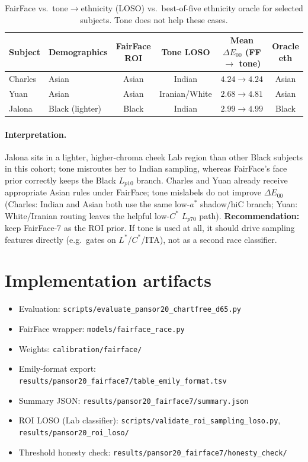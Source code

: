 \documentclass[11pt]{article}
\newcommand{\deee}{\ensuremath{\Delta E_{00}}}
\begin{document}
\begin{table}[h]
\centering
\caption{FairFace vs.\ tone$\to$ethnicity (LOSO) vs.\ best-of-five ethnicity oracle for selected subjects.
Tone does not help these cases.}
\label{tab:tone-cases}
\begin{tabular}{llcccc}
\toprule
Subject & Demographics & FairFace ROI & Tone LOSO & Mean $\deee$ (FF $\to$ tone) & Oracle eth \\
\midrule
Charles & Asian & Asian & Indian & $4.24\to4.24$ & Asian \\
Yuan    & Asian & Asian & Iranian/White & $2.68\to4.81$ & Asian \\
Jalona  & Black (lighter) & Black & Indian & $2.99\to4.99$ & Black \\
\bottomrule
\end{tabular}
\end{table}

\paragraph{Interpretation.}
Jalona sits in a lighter, higher-chroma cheek Lab region than other Black subjects in this cohort; tone misroutes her to Indian sampling, whereas FairFace's face prior correctly keeps the Black $L_{p10}$ branch.
Charles and Yuan already receive appropriate Asian rules under FairFace; tone mislabels do not improve $\deee$ (Charles: Indian and Asian both use the same low-$a^*$ shadow/hiC branch; Yuan: White/Iranian routing leaves the helpful low-$C^*$ $L_{p70}$ path).
\textbf{Recommendation:} keep FairFace-7 as the ROI prior.
If tone is used at all, it should drive sampling features directly (e.g.\ gates on $L^*$/$C^*$/ITA), not as a second race classifier.

\section{Implementation artifacts}

\begin{itemize}[leftmargin=*]
  \item Evaluation: \texttt{scripts/evaluate\_pansor20\_chartfree\_d65.py}
  \item FairFace wrapper: \texttt{models/fairface\_race.py}
  \item Weights: \texttt{calibration/fairface/}
  \item Emily-format export: \texttt{results/pansor20\_fairface7/table\_emily\_format.tsv}
  \item Summary JSON: \texttt{results/pansor20\_fairface7/summary.json}
  \item ROI LOSO (Lab classifier): \texttt{scripts/validate\_roi\_sampling\_loso.py},
    \texttt{results/pansor20\_roi\_loso/}
  \item Threshold honesty check: \texttt{results/pansor20\_fairface7/honesty\_check/}
\end{itemize}
\end{document}

